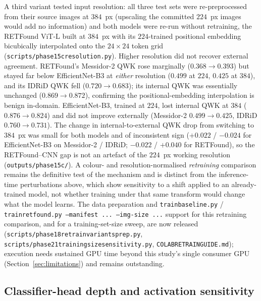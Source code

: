 \documentclass[journal]{IEEEtran}
\renewcommand{\_}{\origunderscore\allowbreak}
\begin{document}
A third variant tested input resolution: all three test sets were
re-preprocessed from their source images at $384$~px (upscaling the committed
$224$~px images would add no information) and both models were re-run without
retraining, the RETFound ViT-L built at $384$~px with its $224$-trained
positional embedding bicubically interpolated onto the $24{\times}24$ token grid
(\texttt{scripts/\allowbreak{}phase15c\_resolution.py}). Higher resolution did not recover
external agreement. RETFound's Messidor-2 QWK rose marginally
($0.368 \to 0.393$) but stayed far below EfficientNet-B3 at \emph{either}
resolution ($0.499$ at $224$, $0.425$ at $384$), and its IDRiD QWK fell
($0.720 \to 0.683$); its internal QWK was essentially unchanged
($0.869 \to 0.872$), confirming the positional-embedding interpolation is benign
in-domain. EfficientNet-B3, trained at $224$, lost internal QWK at $384$
($0.876 \to 0.824$) and did not improve externally (Messidor-2 $0.499 \to 0.425$,
IDRiD $0.760 \to 0.731$). The change in internal-to-external QWK drop from
switching to $384$~px was small for both models and of inconsistent sign
($+0.022$ / $-0.024$ for EfficientNet-B3 on Messidor-2 / IDRiD; $-0.022$ /
$+0.040$ for RETFound), so the RETFound--CNN gap is not an artefact of the
$224$~px working resolution (\texttt{outputs/\allowbreak{}phase15c/\allowbreak{}}). A colour- and
resolution-normalised \emph{retraining} comparison remains the definitive test
of the mechanism and is distinct from the inference-time perturbations above,
which show sensitivity to a shift applied to an already-trained model, not
whether training under that same transform would change what the model learns.
The data preparation and \texttt{train\_baseline.py} /
\texttt{train\_retfound.py --manifest ... --img-size ...} support for this
retraining comparison, and for a training-set-size sweep, are now released
(\texttt{scripts/\allowbreak{}phase18\_retrain\_variants\_prep.py},
\texttt{scripts/\allowbreak{}phase21\_training\_size\_sensitivity.py},
\texttt{COLAB\_RETRAIN\_GUIDE.md}); execution needs sustained GPU time beyond
this study's single consumer GPU (Section~\ref{sec:limitations}) and remains
outstanding.


\subsection{Classifier-head depth and activation sensitivity}
\label{sec:results-headdepth}
\end{document}
